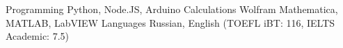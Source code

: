 \begin{cvskills}
	\cvskill
		{Programming}
		{Python, Node.JS, Arduino}
	\cvskill
		{Calculations}
		{Wolfram Mathematica, MATLAB, LabVIEW}
	\cvskill
		{Languages}
		{Russian, English (TOEFL iBT: 116, IELTS Academic: 7.5)}
\end{cvskills}